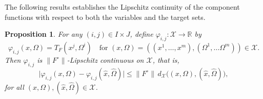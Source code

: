 \documentclass[sn-mathphys-num]{sn-jnl}%
\def\Hat{\widehat}
\newtheorem{proposition}[theorem]{Proposition}
\theoremstyle{definition}
\begin{document}
The following results establishes the Lipschitz continuity of the component functions with respect to both the variables and the target sets.


\begin{proposition}
	\label{O.V.F_Lipschitz_1}
	For any $(i,j)\in I\times J$, define $\varphi_{i,j}:\mathcal{X}\to \mathbb{R}$ by
	\[
	\varphi_{i,j}(x,\Omega)=T_F(x^j,\Omega^i)\quad\text{for }(x,\Omega)=((x^1,\dots,x^m),(\Omega^1,\dots\Omega^m))\in\mathcal{X}.
	\]
	Then $\varphi_{i,j}$ is $\|F^\circ\|$-Lipschitz continuous on $\mathcal{X}$, that is,
	\[
	\big|\varphi_{i,j}(x,\Omega)-\varphi_{i,j}(\Hat x,\Hat \Omega)\big|
	\leq \|F^\circ\|\, d_\mathcal{X}\big((x,\Omega),(\Hat x,\Hat \Omega)\big),
	\]
	for all $(x,\Omega),(\Hat{x},\Hat{\Omega}) \in \mathcal{X}$.
\end{proposition}
\end{document}
